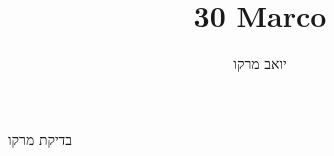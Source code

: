 \documentclass{article}
\title{30 Marco}
\author{יואב מרקו}
\begin{document}
\maketitle

בדיקת מרקו
\end{document}
